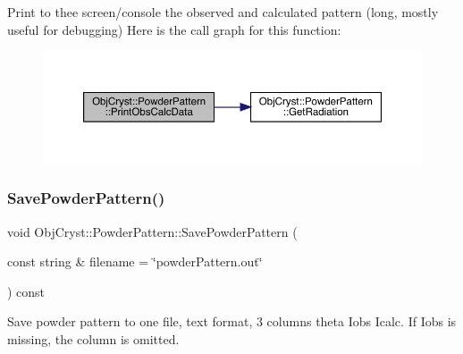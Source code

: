 Print to thee screen/console the observed and calculated pattern (long, mostly useful for debugging) Here is the call graph for this function\+:
\nopagebreak
\begin{figure}[H]
\begin{center}
\leavevmode
\includegraphics[width=350pt]{class_obj_cryst_1_1_powder_pattern_ac08650463b3ecba84111c105726f2420_cgraph}
\end{center}
\end{figure}
\mbox{\label{class_obj_cryst_1_1_powder_pattern_ae9646ceed205b350e0dfa8f1bc5c3e17}} 
\subsubsection{\texorpdfstring{SavePowderPattern()}{SavePowderPattern()}}
{\footnotesize\ttfamily void Obj\+Cryst\+::\+Powder\+Pattern\+::\+Save\+Powder\+Pattern (\begin{DoxyParamCaption}\item[{const string \&}]{filename = {\ttfamily \char`\"{}powderPattern.out\char`\"{}} }\end{DoxyParamCaption}) const}

Save powder pattern to one file, text format, 3 columns theta Iobs Icalc. If Iobs is missing, the column is omitted.

